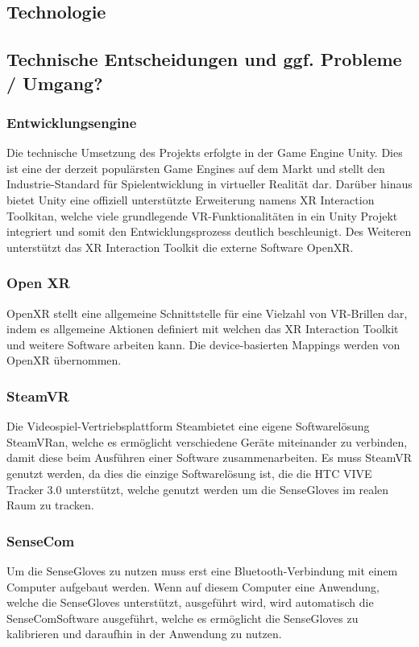 \subsection{Technologie}
\subsection{Technische Entscheidungen und ggf. Probleme / Umgang?}

\subsubsection{Entwicklungsengine}
Die technische Umsetzung des Projekts erfolgte in der Game Engine \dq Unity\dq. Dies ist eine der derzeit populärsten Game Engines auf dem Markt und stellt den Industrie-Standard für Spielentwicklung in virtueller Realität dar. Darüber hinaus bietet Unity eine offiziell unterstützte Erweiterung namens \dq XR Interaction Toolkit\dq an, welche viele grundlegende VR-Funktionalitäten in ein Unity Projekt integriert und somit den Entwicklungsprozess deutlich beschleunigt. Des Weiteren unterstützt das XR Interaction Toolkit die externe Software \dq OpenXR\dq.

\subsubsection{Open XR}
OpenXR stellt eine allgemeine Schnittstelle für eine Vielzahl von VR-Brillen dar, indem es allgemeine Aktionen definiert mit welchen das XR Interaction Toolkit und weitere Software arbeiten kann. Die device-basierten Mappings werden von OpenXR übernommen.

\subsubsection{SteamVR}
Die Videospiel-Vertriebsplattform \dq Steam\dq bietet eine eigene Softwarelösung \dq SteamVR\dq an, welche es ermöglicht verschiedene Geräte miteinander zu verbinden, damit diese beim Ausführen einer Software zusammenarbeiten. Es muss SteamVR genutzt werden, da dies die einzige Softwarelösung ist, die die HTC VIVE Tracker 3.0 unterstützt, welche genutzt werden um die SenseGloves im realen Raum zu tracken.

\subsubsection{SenseCom}
Um die SenseGloves zu nutzen muss erst eine Bluetooth-Verbindung mit einem Computer aufgebaut werden. Wenn auf diesem Computer eine Anwendung, welche die SenseGloves unterstützt, ausgeführt wird, wird automatisch die \dq SenseCom\dq Software ausgeführt, welche es ermöglicht die SenseGloves zu kalibrieren und daraufhin in der Anwendung zu nutzen.
